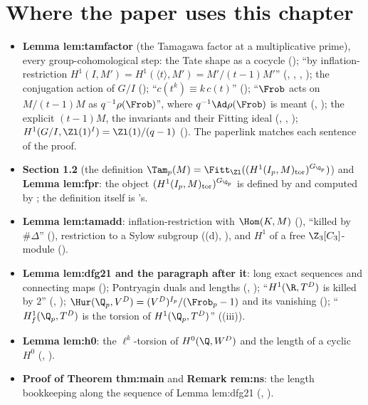 \section*{Where the paper uses this chapter}

\begin{itemize}
\item \textbf{Lemma lem:tamfactor} (the Tamagawa factor at a multiplicative prime), every group-cohomological step: the Tate shape as a cocycle
(); ``by inflation-restriction $H^1(I,M')=H^1(\langle t\rangle,M')=M'/(t-1)M'$'' (, ,
, ); the conjugation action of $G/I$ (); ``$c(t^k)\equiv k\,c(t)$''
(); ``$\Frob$ acts on $M/(t-1)M$ as $q^{-1}\rho(\Frob)$'', where $q^{-1}\Ad\rho(\Frob)$ is meant (, ); the explicit $(t-1)M$, the invariants and their
Fitting ideal (, , ); $H^1(G/I,\Zl(1)^I)=\Zl(1)/(q-1)$
(). The paperlink  matches each sentence of the proof.
\item \textbf{Section 1.2} (the definition $\Tam_p(M)=\Fitt_{\Zl}((H^1(I_p,M)_{\mathrm{tor}})^{G_{\Q_p}})$) and \textbf{Lemma lem:fpr}: the object $(H^1(I_p,M)_{\mathrm{tor}})^{G_{\Q_p}}$ is
defined by  and computed by ; the definition itself is 's.
\item \textbf{Lemma lem:tamadd}: inflation-restriction with $\Hom(K,M)$ (), ``killed by $\#\Delta$'' (), restriction to a
Sylow subgroup ((d), ), and $H^1$ of a free $\Z_3[C_3]$-module ().
\item \textbf{Lemma lem:dfg21 and the paragraph after it}: long exact sequences and connecting maps (); Pontryagin
duals and lengths (, ); ``$H^1(\R,T^D)$ is killed by $2$'' (, );
$\Hur(\Q_p,V^D)=(V^D)^{I_p}/(\Frob_p-1)$ and its vanishing (); ``$H^1_f(\Q_p,T^D)$ is the torsion of $H^1(\Q_p,T^D)$''
((iii)).
\item \textbf{Lemma lem:h0}: the $\ell^k$-torsion of $H^0(\Q,W^D)$ and the length of a cyclic $H^0$ (, ).
\item \textbf{Proof of Theorem thm:main} and \textbf{Remark rem:ns}: the length bookkeeping along the sequence of Lemma lem:dfg21 (,
).
\end{itemize}

